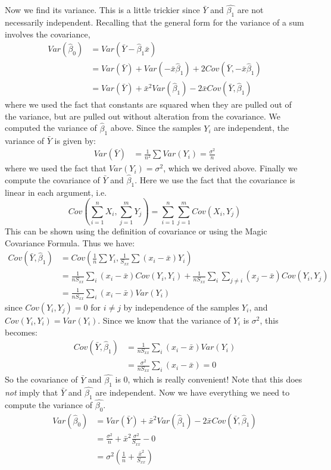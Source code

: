 \documentclass[notes.tex]{subfiles}
\begin{document}
Now we find its variance. This is a little trickier since $\bar{Y}$ and $\hat{\beta_1}$ are not necessarily independent. Recalling that the general form for the variance of a sum involves the covariance,
\begin{align*}
Var(\hat{\beta}_0) &= Var( \bar{Y} - \hat{\beta}_1 \bar{x} ) \\
&= Var( \bar{Y} ) + Var( - \bar{x} \hat{\beta}_1 ) + 2 Cov (\bar{Y}, - \bar{x} \hat{\beta}_1 ) \\
&= Var( \bar{Y} ) + \bar{x}^2 Var( \hat{\beta}_1 ) - 2 \bar{x} Cov (\bar{Y}, \hat{\beta}_1 )
\end{align*}
where we used the fact that constants are squared when they are pulled out of the variance, but are pulled out without alteration from the covariance. We computed the variance of $\hat{\beta}_1$ above. Since the samples $Y_i$ are independent, the variance of $\bar{Y}$ is given by:
\begin{align*}
Var(\bar{Y}) &= \frac{1}{n^2} \sum Var(Y_i) = \frac{\sigma^2}{n}
\end{align*}
where we used the fact that $Var(Y_i) = \sigma^2$, which we derived above. Finally we compute the covariance of $\bar{Y}$ and $\hat{\beta}_1$. Here we use the fact that the covariance is linear in each argument, i.e. 
\[
Cov\left( \sum_{i=1}^n X_i, \sum_{j=1}^m Y_j\right) = \sum_{i=1}^n \sum_{j=1}^m Cov(X_i, Y_j)
\]
This can be shown using the definition of covariance or using the Magic Covariance Formula. Thus we have:
\begin{align*}
Cov (\bar{Y}, \hat{\beta}_1 ) &= Cov \left( \frac{1}{n} \sum Y_i, \frac{1}{S_{xx}}\sum (x_i - \bar{x})Y_i \right)\\
&= \frac{1}{n S_{xx} } \sum_i (x_i - \bar{x}) Cov(Y_i, Y_i) + \frac{1}{n S_{xx} } \sum_i \sum_{j \neq i} (x_j - \bar{x}) Cov(Y_i, Y_j) \\
&= \frac{1}{n S_{xx} } \sum_i (x_i - \bar{x}) Var(Y_i)
\end{align*}
since $Cov(Y_i, Y_j) = 0$ for $i \neq j$ by independence of the samples $Y_i$, and $Cov(Y_i, Y_i) = Var(Y_i)$. Since we know that the variance of $Y_i$ is $\sigma^2$, this becomes:
\begin{align*}
Cov (\bar{Y}, \hat{\beta}_1 ) &= \frac{1}{n S_{xx} } \sum_i (x_i - \bar{x}) Var(Y_i) \\
&= \frac{\sigma^2}{n S_{xx} } \sum_i (x_i - \bar{x}) = 0
\end{align*}
So the covariance of $\bar{Y}$ and $\hat{\beta_1}$ is 0, which is really convenient! Note that this does \emph{not} imply that $\bar{Y}$ and $\hat{\beta_1}$ are independent. Now we have everything we need to compute the variance of $\hat{\beta_0}$.
\begin{align*}
Var(\hat{\beta}_0) &= Var( \bar{Y} ) + \bar{x}^2 Var( \hat{\beta}_1 ) - 2 \bar{x} Cov (\bar{Y}, \hat{\beta}_1 ) \\
&= \frac{\sigma^2}{n} + \bar{x}^2 \frac{ \sigma^2 }{S_{xx}} - 0 \\
&= \sigma^2 \left( \frac{1}{n} + \frac{ \bar{x}^2 }{S_{xx}} \right) 
\end{align*}
\end{document}
